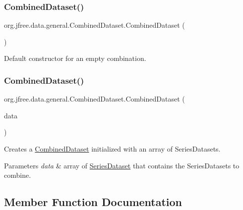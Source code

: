 \subsubsection{\texorpdfstring{Combined\+Dataset()}{CombinedDataset()}\hspace{0.1cm}{\footnotesize\ttfamily [1/2]}}
{\footnotesize\ttfamily org.\+jfree.\+data.\+general.\+Combined\+Dataset.\+Combined\+Dataset (\begin{DoxyParamCaption}{ }\end{DoxyParamCaption})}

Default constructor for an empty combination. \mbox{\label{classorg_1_1jfree_1_1data_1_1general_1_1_combined_dataset_a4bdbc33ad5f47b8a83611f834e367038}} 
\subsubsection{\texorpdfstring{Combined\+Dataset()}{CombinedDataset()}\hspace{0.1cm}{\footnotesize\ttfamily [2/2]}}
{\footnotesize\ttfamily org.\+jfree.\+data.\+general.\+Combined\+Dataset.\+Combined\+Dataset (\begin{DoxyParamCaption}\item[{\mbox{\hyperlink{interfaceorg_1_1jfree_1_1data_1_1general_1_1_series_dataset}{Series\+Dataset}} \mbox{[}$\,$\mbox{]}}]{data }\end{DoxyParamCaption})}

Creates a \mbox{\hyperlink{classorg_1_1jfree_1_1data_1_1general_1_1_combined_dataset}{Combined\+Dataset}} initialized with an array of Series\+Datasets.


\begin{DoxyParams}{Parameters}
{\em data} & array of \mbox{\hyperlink{interfaceorg_1_1jfree_1_1data_1_1general_1_1_series_dataset}{Series\+Dataset}} that contains the Series\+Datasets to combine. \\
\hline
\end{DoxyParams}


\subsection{Member Function Documentation}
\mbox{\label{classorg_1_1jfree_1_1data_1_1general_1_1_combined_dataset_a4bfbe145c079542407e8b5e0f2a3aafb}} 

